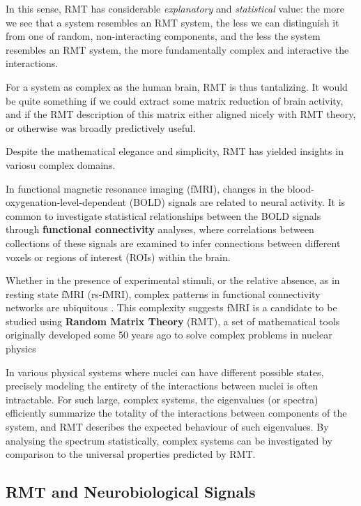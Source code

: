 \documentclass[12pt]{spieman}  %
\begin{document}
\begin{spacing}{2}
In this sense, RMT has considerable \textit{explanatory} and \textit{statistical} value: the more we
see that a system resembles an RMT system, the less we can distinguish it from one of random,
non-interacting components, and the less the system resembles an RMT system, the more
fundamentally complex and interactive the interactions.

For a system as complex as the human brain, RMT is thus tantalizing. It would be quite something
if we could extract some matrix reduction of brain activity, and if the RMT description of this
matrix either aligned nicely with RMT theory, or otherwise was broadly predictively useful.


Despite the mathematical elegance and simplicity, RMT has yielded insights in variosu complex domains.


In functional magnetic resonance imaging (fMRI), changes in the blood-oxygenation-level-dependent
(BOLD) signals are related to neural activity. It is common to investigate statistical relationships
between the BOLD signals through \textbf{functional connectivity} analyses, where correlations between
collections of these signals are examined to infer connections between different voxels or regions
of interest (ROIs) within the brain.

Whether in the presence of experimental stimuli, or the relative absence, as in resting state fMRI (rs-fMRI),
complex patterns in functional connectivity networks are ubiquitous
\cite{bucknerBrainDefaultNetwork2008,foxCoverHumanBrain2005,gonzalez-castilloTaskbasedDynamicFunctional2018,hermundstadStructuralFoundationsRestingstate2013}.
This complexity suggests fMRI is a candidate to be studied using \textbf{Random Matrix Theory} (RMT), a set
of mathematical tools originally developed some 50 years ago to solve complex problems in nuclear
physics \cite{guhrRandommatrixTheoriesQuantum1998a,mehtaRandomMatrices2004}

In various
physical systems where nuclei can have different possible states, precisely modeling the entirety of
the interactions between nuclei is often intractable. For such large, complex systems, the
eigenvalues (or spectra) efficiently summarize the totality of the interactions between components
of the system, and RMT describes the expected behaviour of such eigenvalues. By analysing the
spectrum statistically, complex systems can be investigated by comparison to the universal
properties predicted by RMT.

\subsection{RMT and Neurobiological Signals}


\end{spacing}
\end{document}
